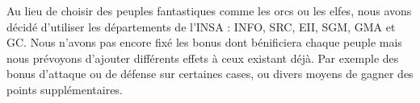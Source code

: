 Au lieu de choisir des peuples fantastiques comme les orcs ou les elfes, nous avons décidé d'utiliser les départements de l'INSA : INFO, SRC, EII, SGM, GMA et GC. Nous n'avons pas encore fixé les bonus dont bénificiera chaque peuple mais nous prévoyons d'ajouter différents effets à ceux existant déjà. Par exemple des bonus d'attaque ou de défense sur certaines cases, ou divers moyens de gagner des points supplémentaires.
